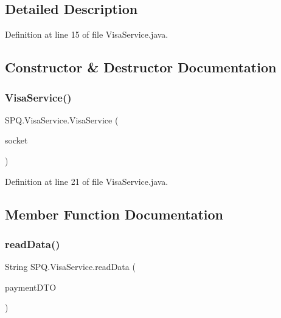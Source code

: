 \subsection{Detailed Description}


Definition at line 15 of file Visa\+Service.\+java.



\subsection{Constructor \& Destructor Documentation}
\mbox{\label{class_s_p_q_1_1_visa_service_a18a0c5b945cf8164f1069230db5ddc91}} 
\subsubsection{\texorpdfstring{Visa\+Service()}{VisaService()}}
{\footnotesize\ttfamily S\+P\+Q.\+Visa\+Service.\+Visa\+Service (\begin{DoxyParamCaption}\item[{Socket}]{socket }\end{DoxyParamCaption})}



Definition at line 21 of file Visa\+Service.\+java.



\subsection{Member Function Documentation}
\mbox{\label{class_s_p_q_1_1_visa_service_a9f06022375e8bd98b78a8268bdc4ff05}} 
\subsubsection{\texorpdfstring{read\+Data()}{readData()}}
{\footnotesize\ttfamily String S\+P\+Q.\+Visa\+Service.\+read\+Data (\begin{DoxyParamCaption}\item[{\mbox{\hyperlink{class_s_p_q_1_1dto_1_1_payment_d_t_o}{Payment\+D\+TO}}}]{payment\+D\+TO }\end{DoxyParamCaption})}



